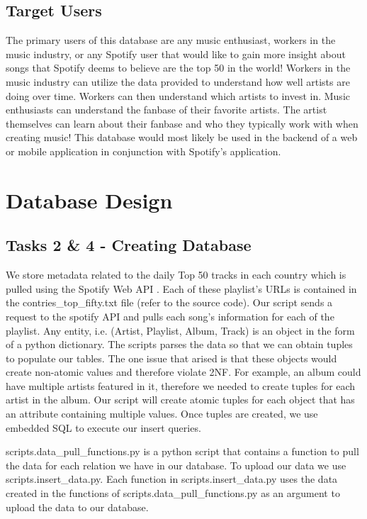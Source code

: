 \documentclass[conference]{IEEEtran}
\begin{document}
\subsection{Target Users}
The primary users of this database are any music enthusiast, workers in the music industry, or any Spotify user that would like to gain more insight about songs that Spotify deems to believe are the top 50 in the world! Workers in the music industry can utilize the data provided to understand how well artists are doing over time. Workers can then understand which artists to invest in. Music enthusiasts can understand the fanbase of their favorite artists. The artist themselves can learn about their fanbase and who they typically work with when creating music! This database would most likely be used in the backend of a web or mobile application in conjunction with Spotify’s application.

\section{Database Design}

\subsection{\textbf{Tasks 2 \& 4} - Creating Database}
We store metadata related to the daily Top 50 tracks in each country which is pulled using the Spotify Web API \cite{b1}. Each of these playlist's URLs is contained in the contries\_top\_fifty.txt file (refer to the source code). Our script sends a request to the spotify API and pulls each song's information for each of the playlist. Any entity, i.e. (Artist, Playlist, Album, Track) is an object in the form of a python dictionary. The scripts parses the data so that we can obtain tuples to populate our tables. The one issue that arised is that these objects would create non-atomic values and therefore violate 2NF. For example, an album could have multiple artists featured in it, therefore we needed to create tuples for each artist in the album.  Our script will create atomic tuples for each object that has an attribute containing multiple values. Once tuples are created, we use embedded SQL to execute our insert queries.

scripts.data\_pull\_functions.py is a python script that contains a function to pull the data for each relation we have in our database.  To upload our data we use scripts.insert\_data.py.  Each function in scripts.insert\_data.py uses the data created in the functions of scripts.data\_pull\_functions.py as an argument to upload the data to our database.
\end{document}
